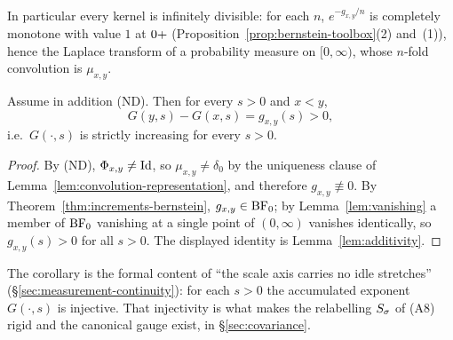 In particular every kernel is infinitely divisible: for each $n$, $e^{-g_{x,y}/n}$ is
completely monotone with value $1$ at $0{+}$ (Proposition~\ref{prop:bernstein-toolbox}(2)
and~(1)), hence the Laplace transform of a probability measure on $[0,\infty)$, whose $n$-fold
convolution is $\mu_{x,y}$.

\begin{corollary}\label{cor:strict-monotonicity}
Assume in addition (ND). Then for every $s > 0$ and $x < y$,
\[
  G(y, s) - G(x, s) = g_{x,y}(s) > 0,
\]
i.e.\ $G(\cdot, s)$ is strictly increasing for every $s > 0$.
\end{corollary}

\begin{proof}
By (ND), $\Phi_{x,y} \ne \mathrm{Id}$, so $\mu_{x,y} \ne \delta_0$ by the uniqueness clause of
Lemma~\ref{lem:convolution-representation}, and therefore $g_{x,y} \not\equiv 0$. By
Theorem~\ref{thm:increments-bernstein}, $g_{x,y} \in \mathrm{BF}_0$; by Lemma~\ref{lem:vanishing} a
member of $\mathrm{BF}_0$ vanishing at a single point of $(0,\infty)$ vanishes identically, so
$g_{x,y}(s) > 0$ for all $s > 0$. The displayed identity is Lemma~\ref{lem:additivity}.
\end{proof}

The corollary is the formal content of ``the scale axis carries no idle stretches''
(\S\ref{sec:measurement-continuity}): for each $s > 0$ the accumulated exponent $G(\cdot, s)$
is injective. That injectivity is what makes the relabelling $S_\sigma$ of (A8) rigid and
the canonical gauge exist, in \S\ref{sec:covariance}.
